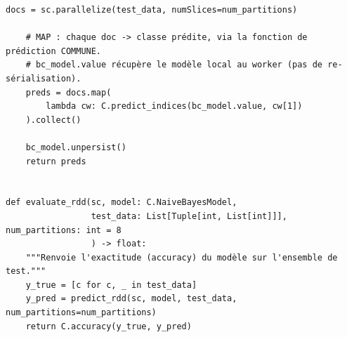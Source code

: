 \begin{lstlisting}[style=py]
    docs = sc.parallelize(test_data, numSlices=num_partitions)

    # MAP : chaque doc -> classe prédite, via la fonction de prédiction COMMUNE.
    # bc_model.value récupère le modèle local au worker (pas de re-sérialisation).
    preds = docs.map(
        lambda cw: C.predict_indices(bc_model.value, cw[1])
    ).collect()

    bc_model.unpersist()
    return preds


def evaluate_rdd(sc, model: C.NaiveBayesModel,
                 test_data: List[Tuple[int, List[int]]], num_partitions: int = 8
                 ) -> float:
    """Renvoie l'exactitude (accuracy) du modèle sur l'ensemble de test."""
    y_true = [c for c, _ in test_data]
    y_pred = predict_rdd(sc, model, test_data, num_partitions=num_partitions)
    return C.accuracy(y_true, y_pred)
\end{lstlisting}

